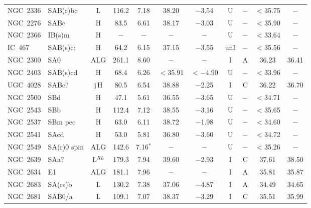 \begin{center}
\begin{longtable}{lC{2.5cm}ccccccccc}
NGC~2336 & SAB(r)bc       &  L              & 116.2 & 7.18           & 38.20    & $-$3.54   & U   & $-$     & $<$35.75 & $-$         \\
NGC~2276 & SABc            &  H          &    83.5   &  6.61          &  38.17   &  $-$3.03   & U & $-$     & $<$35.90 & $-$      \\
NGC~2366 & IB(s)m          & H        & $-$   & $-$            & $-$      & $-$     & U   &$-$      & $<$33.64 & $-$        \\
IC~467       & SAB(s)c:       &  H              & 64.2  & 6.15           & 37.15    & $-$3.55  & unI &$-$     & $<$35.56 & $-$         \\
NGC~2300  & SA0            & ALG      &   261.1   &  8.60           &  $-$    &  $-$        &    I  & A &  36.23   &   36.41  \\
NGC~2403 & SAB(s)cd       &  H        & 68.4  & 6.26           & $<$35.91    & $<-$4.90 & U   &$-$      & $<$33.96 & $-$        \\
UGC~4028  & SABc?         &    j\,H        &   80.5   &  6.54        &  38.88  &  $-$2.25   &   I   & C  &  36.22  &  36.70    \\
NGC~2500  & SBd          &    H          &  47.1    &  5.61        &    36.55  &  $-$3.65   &  U  & $-$     & $<$34.71 & $-$    \\
NGC~2543  & SBb         &    H          &  112.4   &  7.12        &   38.55   &  $-$3.16   &  U &   $-$     & $<$35.65 & $-$   \\
NGC~2537  & SBm pec   & H           &   63.0       &  6.11        &  38.72    &  $-$1.98    &  U & $-$    &   $<$34.60  &  $-$  \\
NGC~2541  & SAcd     &    H          &   53.0        & 5.81         &   36.80   &  $-$3.60    &  U & $-$    &   $<$34.72  &  $-$   \\
NGC~2549 & SA(r)0 spin   & ALG       & 142.6 & 7.16$^{*}$     & $-$      & $-$      & U   & $-$      & $<$35.26 & $-$        \\
NGC~2639  & SAa?         &    L$^{RL}$          &  179.3   & 7.94          &  39.60    &  $-$2.93   &  I   & C   &  37.61   &  38.50   \\
NGC~2634  & E1            &   ALG      &  181.1   &  7.96        &   $-$       &  $-$         &   I   & A    &  35.81   &  35.87  \\
NGC~2683 & SA(rs)b         & L               & 130.2 & 7.38           & 37.06    & $-$4.87   &  I  & A       & 34.49    &  34.65         \\
NGC~2681  & SAB0/a       & L           &    109.1   &  7.07       &   38.37   &  $-$3.29   &   I  & C  &   35.51   &   35.99   \\

\end{longtable}
\end{center}
